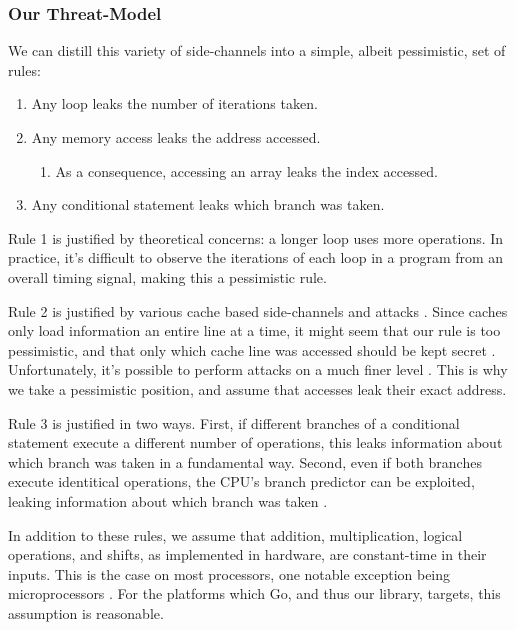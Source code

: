\documentclass[11pt, a4paper]{article} %
\begin{document}
{\subsubsection{Our Threat-Model}
\label{threat_model}

We can distill this variety of side-channels into a simple,
albeit pessimistic, set of rules:

\begin{enumerate}
  \item Any loop leaks the number of iterations taken.
  \item Any memory access leaks the address accessed.
  \begin{enumerate}
    \item As a consequence, accessing an array leaks the index accessed.
  \end{enumerate}
  \item Any conditional statement leaks which branch was taken.
\end{enumerate}

Rule 1 is justified by theoretical concerns: a longer loop
uses more operations. In practice, it's difficult to observe
the iterations of each loop in a program from an overall timing signal,
making this a pessimistic rule.

Rule 2 is justified by various cache based side-channels and attacks
\cite{
  bernstein_cache-timing_2005,
  yarom_cachebleed_2017,
  cabrera_aldaya_cache-timing_2019}.
Since caches only load information an entire line at a time, it might
seem that our rule is too pessimistic, and that only which cache line
was accessed should be kept secret \cite{brickell_technologies_2011}.
Unfortunately, it's possible to perform
attacks on a much finer level
\cite{
  bernstein_word_2013,
  osvik_cache_2006,
  yarom_cachebleed_2017}.
This is why we take a pessimistic position, and assume
that accesses leak their exact address.


Rule 3 is justified in two ways. First, if different branches of a conditional
statement execute a different number of operations, this leaks information
about which branch was taken in a fundamental way. Second, even if both
branches execute identitical operations, the CPU's branch predictor
can be exploited, leaking information about which branch was taken
\cite{
  aciicmez_predicting_2006,
  aciicmez_power_2007,
  evtyushkin_jump_2016}.

In addition to these rules, we assume that addition, multiplication,
logical operations, and shifts, as implemented in hardware,
are constant-time in their inputs.
This is the case on most processors, one notable exception being
microprocessors
\cite{pornin_bearssl_nodate}. For the platforms which Go,
and thus our library, targets,
this assumption is reasonable.

}
\end{document}
